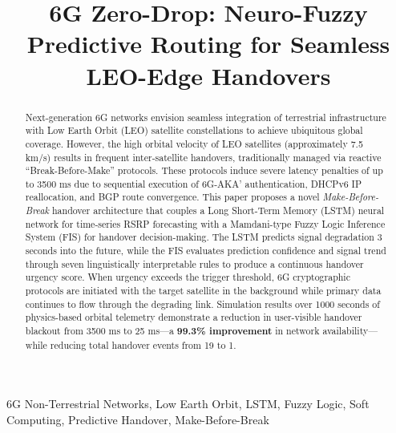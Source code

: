 \documentclass[conference]{IEEEtran}
\begin{document}
\title{6G Zero-Drop: Neuro-Fuzzy Predictive Routing for Seamless LEO-Edge Handovers}

\author{
}

\maketitle

\begin{abstract}
Next-generation 6G networks envision seamless integration of terrestrial infrastructure with Low Earth Orbit (LEO) satellite constellations to achieve ubiquitous global coverage. However, the high orbital velocity of LEO satellites (approximately 7.5 km/s) results in frequent inter-satellite handovers, traditionally managed via reactive ``Break-Before-Make'' protocols. These protocols induce severe latency penalties of up to 3500 ms due to sequential execution of 6G-AKA' authentication, DHCPv6 IP reallocation, and BGP route convergence. This paper proposes a novel \textit{Make-Before-Break} handover architecture that couples a Long Short-Term Memory (LSTM) neural network for time-series RSRP forecasting with a Mamdani-type Fuzzy Logic Inference System (FIS) for handover decision-making. The LSTM predicts signal degradation 3 seconds into the future, while the FIS evaluates prediction confidence and signal trend through seven linguistically interpretable rules to produce a continuous handover urgency score. When urgency exceeds the trigger threshold, 6G cryptographic protocols are initiated with the target satellite in the background while primary data continues to flow through the degrading link. Simulation results over 1000 seconds of physics-based orbital telemetry demonstrate a reduction in user-visible handover blackout from 3500 ms to 25 ms---a \textbf{99.3\% improvement} in network availability---while reducing total handover events from 19 to 1.
\end{abstract}

\begin{IEEEkeywords}
6G Non-Terrestrial Networks, Low Earth Orbit, LSTM, Fuzzy Logic, Soft Computing, Predictive Handover, Make-Before-Break
\end{IEEEkeywords}
\end{document}
